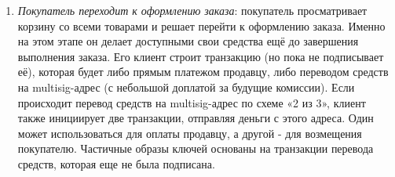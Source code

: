 \begin{enumerate}
\begin{enumerate}
        Ключ просмотра является хешем общего секретного приватного ключа покупателя и продавца (а не агрегированным приватным ключом, то есть ключом, созданным до предварительного {\tt premerge (объединения)}), а ключ шифрования для обмена данными между покупателем и продавцом — это хеш ключа просмотра.\footnote{Тот же самый процесс будет использоваться в случае со схемой «1 из 2» без участия модератора.}
        \item {\em Покупатель переходит к оформлению заказа}: покупатель просматривает корзину со всеми товарами и решает перейти к оформлению заказа. Именно на этом этапе он делает доступными свои средства ещё до завершения выполнения заказа. Его клиент строит транзакцию (но пока не подписывает её), которая будет либо прямым платежом продавцу, либо переводом средств на multisig-адрес (с небольшой допла\-той за будущие комиссии). Если происходит перевод средств на multisig-адрес по схеме «2 из 3», клиент также инициирует две транзакции, отправляя деньги с этого адреса. Один может использоваться для оплаты продавцу, а другой - для возмещения покупателю. Частичные образы ключей основаны на транзакции перевода средств, которая еще не была подписана.\\


\end{enumerate}
\end{enumerate}
